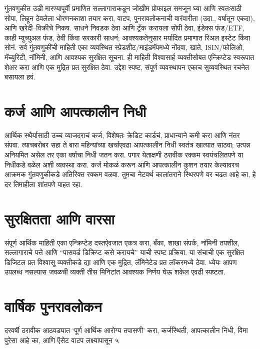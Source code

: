 गुंतवणुकीत उडी मारण्यापूर्वी प्रमाणित सल्लागाराकडून जोखीम प्रोफाइल समजून घ्या आणि स्वतःसाठी सोपा, लिहून ठेवलेला धोरणनकाशा तयार करा, वाटप, पुनरावलोकनाची वारंवारीता (उदा., वर्षातून एकदा), आणि खरेदी–विक्रीचे निकष. साधने निवडक ठेवा आणि ट्रॅक करायला सोपी ठेवा, इंडेक्स फंड/ETF, काही म्युच्युअल फंड, ठेवी किंवा सरकारी साधनं; आवश्यकतेनुसार मर्यादित प्रमाणात रिअल इस्टेट किंवा सोनं. सर्व गुंतवणुकींची माहिती एका व्यवस्थित स्प्रेडशीट/माइंडमॅपमध्ये नोंदवा, खाते, ISIN/फोलिओ, मॅच्युरिटी, नॉमिनी, आणि आवश्यक सुरक्षित सूचना. ही माहिती विश्वासार्ह व्यक्तीसोबत एन्क्रिप्टेड स्वरूपात शेअर करा आणि एक मुद्रित प्रत सुरक्षित ठेवा. उद्देश स्पष्ट, संपूर्ण व्यवस्थापन एकाच सुव्यवस्थित रचनेत बसायला हवं.

\section*{कर्ज आणि आपत्कालीन निधी}

आर्थिक स्थैर्यासाठी उच्च व्याजदराचं कर्ज, विशेषतः क्रेडिट कार्डचं, प्राधान्याने कमी करा आणि नंतर संपवा. त्याचबरोबर सहा ते बारा महिन्यांच्या खर्चाएवढा आपत्कालीन निधी स्वतंत्र खात्यात साठवा; उत्पन्न अनियमित असेल तर एका वर्षाचा निधी जतन करा. पगार येताक्षणी ठरावीक रक्कम स्वयंचलितपणे या निधीकडे वळेल अशी व्यवस्था करा. कर्ज मोकळं करून आणि आपत्कालीन कुशन तयार केल्यावरच आक्रमक गुंतवणुकीकडे अतिरिक्त रक्कम वळवा. तुमचा नेटवर्थ कालांतराने स्थिरपणे वर चढत आहे का, हे दर तिमाहीला शांतपणे पाहत रहा.

\section*{सुरक्षितता आणि वारसा}

संपूर्ण आर्थिक माहिती एका एन्क्रिप्टेड दस्तऐवजात एकत्र करा, बँका, शाखा संपर्क, नॉमिनी तपशील, सल्लागाराचे पत्ते आणि “पासवर्ड डिक्रिप्ट कसे करायचे” याची स्पष्ट प्रक्रिया. या संचाची एक सुरक्षित डिजिटल प्रत विश्वासू व्यक्तीकडे द्या आणि एक मुद्रित, लॅमिनेटेड प्रत लॉकरमध्ये ठेवा. ध्येयः आपण उपलब्ध नसल्यास जवळची व्यक्ती तीस मिनिटांत आवश्यक निर्णय घेऊ शकेल एवढी स्पष्टता.

\section*{वार्षिक पुनरावलोकन}

दरवर्षी ठरावीक आठवड्यात ‘पूर्ण आर्थिक आरोग्य तपासणी’ करा, कर्जस्थिती, आपत्कालीन निधी, विमा पुरेसा आहे का, आणि ऍसेट वाटप लक्ष्यापासून ५%

